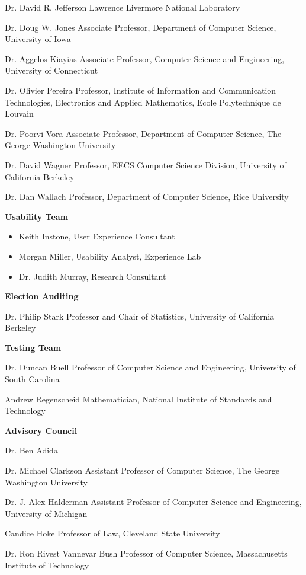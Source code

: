 Dr. David R. Jefferson
Lawrence Livermore National Laboratory
 
Dr. Doug W. Jones
Associate Professor, Department of Computer Science, University of Iowa
 
Dr. Aggelos Kiayias
Associate Professor, Computer Science and Engineering, University of Connecticut
 
Dr. Olivier Pereira
Professor, Institute of Information and Communication Technologies, Electronics and Applied Mathematics, Ecole Polytechnique de Louvain
 
Dr. Poorvi Vora
Associate Professor, Department of Computer Science, The George Washington University
 
Dr. David Wagner
Professor, EECS Computer Science Division, University of California Berkeley
 
Dr. Dan Wallach
Professor, Department of Computer Science, Rice University
 
\textbf{Usability Team}

\begin{itemize}
\item Keith Instone, User Experience Consultant
\item Morgan Miller, Usability Analyst, Experience Lab
\item Dr. Judith Murray, Research Consultant
\end{itemize}

\textbf{Election Auditing}

Dr. Philip Stark
Professor and Chair of Statistics, University of California Berkeley
 
\textbf{Testing Team}

Dr. Duncan Buell
Professor of Computer Science and Engineering, University of South Carolina
 
Andrew Regenscheid
Mathematician, National Institute of Standards and Technology
 
\textbf{Advisory Council}

Dr. Ben Adida
 
Dr. Michael Clarkson
Assistant Professor of Computer Science, The George Washington University
 
Dr. J. Alex Halderman
Assistant Professor of Computer Science and Engineering, University of Michigan
 
Candice Hoke
Professor of Law, Cleveland State University
 
Dr. Ron Rivest
Vannevar Bush Professor of Computer Science, Massachusetts Institute of Technology
 
